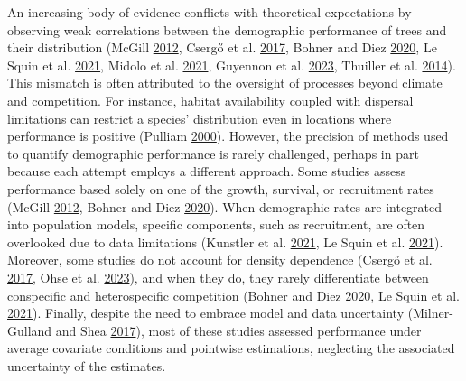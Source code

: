 \documentclass[12pt]{article}
\begin{document}
An increasing body of evidence conflicts with theoretical expectations
by observing weak correlations between the demographic performance of
trees and their distribution (McGill
\protect\hyperlink{ref-McGill2012}{2012}, Csergő et al.
\protect\hyperlink{ref-Csergo2017}{2017}, Bohner and Diez
\protect\hyperlink{ref-bohner2020}{2020}, Le Squin et al.
\protect\hyperlink{ref-LeSquin2021}{2021}, Midolo et al.
\protect\hyperlink{ref-Midolo2021}{2021}, Guyennon et al.
\protect\hyperlink{ref-Guyennon2023}{2023}, Thuiller et al.
\protect\hyperlink{ref-Thuiller2014}{2014}). This mismatch is often
attributed to the oversight of processes beyond climate and competition.
For instance, habitat availability coupled with dispersal limitations
can restrict a species' distribution even in locations where performance
is positive (Pulliam \protect\hyperlink{ref-Pulliam2000}{2000}).
However, the precision of methods used to quantify demographic
performance is rarely challenged, perhaps in part because each attempt
employs a different approach. Some studies assess performance based
solely on one of the growth, survival, or recruitment rates (McGill
\protect\hyperlink{ref-McGill2012}{2012}, Bohner and Diez
\protect\hyperlink{ref-bohner2020}{2020}). When demographic rates are
integrated into population models, specific components, such as
recruitment, are often overlooked due to data limitations (Kunstler et
al. \protect\hyperlink{ref-Kunstler2021}{2021}, Le Squin et al.
\protect\hyperlink{ref-LeSquin2021}{2021}). Moreover, some studies do
not account for density dependence (Csergő et al.
\protect\hyperlink{ref-Csergo2017}{2017}, Ohse et al.
\protect\hyperlink{ref-Ohse2023}{2023}), and when they do, they rarely
differentiate between conspecific and heterospecific competition (Bohner
and Diez \protect\hyperlink{ref-bohner2020}{2020}, Le Squin et al.
\protect\hyperlink{ref-LeSquin2021}{2021}). Finally, despite the need to
embrace model and data uncertainty (Milner-Gulland and Shea
\protect\hyperlink{ref-MilnerGulland2017a}{2017}), most of these studies
assessed performance under average covariate conditions and pointwise
estimations, neglecting the associated uncertainty of the estimates.
\end{document}
